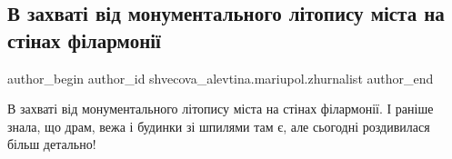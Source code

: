  
 
 
 
 

\subsection{В захваті від монументального літопису міста на стінах філармонії}
\label{sec:24_11_2021.fb.shvecova_alevtina.mariupol.zhurnalist.1.v_zakhvat__v_d_monum}

\ifcmt
 author_begin
   author_id shvecova_alevtina.mariupol.zhurnalist
 author_end
\fi

В захваті від монументального літопису міста на стінах філармонії. І раніше
знала, що драм, вежа і будинки зі шпилями там є, але сьогодні роздивилася більш
детально!

